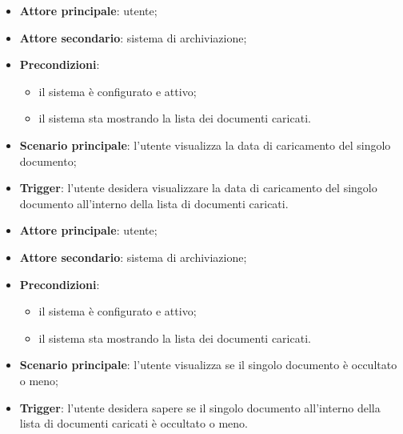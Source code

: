 \documentclass[10pt, a4paper]{article}
\begin{document}
    \begin{itemize}
        \item \textbf{Attore principale}: utente;
        \item \textbf{Attore secondario}: sistema di archiviazione;
        \item \textbf{Precondizioni}:
            \begin{itemize}
                \item il sistema è configurato e attivo;
                \item il sistema sta mostrando la lista dei documenti caricati.
            \end{itemize}
        \item \textbf{Scenario principale}: l'utente visualizza la data di caricamento del singolo documento;
        \item \textbf{Trigger}: l’utente desidera visualizzare la data di caricamento del singolo documento all’interno della lista di documenti caricati.
    \end{itemize}

    \begin{itemize}
        \item \textbf{Attore principale}: utente;
        \item \textbf{Attore secondario}: sistema di archiviazione;
        \item \textbf{Precondizioni}:
            \begin{itemize}
                \item il sistema è configurato e attivo;
                \item il sistema sta mostrando la lista dei documenti caricati.
            \end{itemize}
        \item \textbf{Scenario principale}: l'utente visualizza se il singolo documento è occultato o meno;
        \item \textbf{Trigger}: l’utente desidera sapere se il singolo documento all’interno della lista di documenti caricati è occultato o meno.
    \end{itemize}
\end{document}
